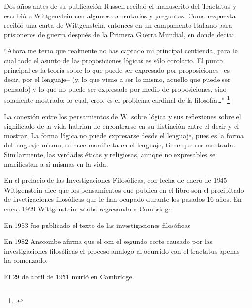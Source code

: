 \documentclass[../main.tex]{subfiles}
\begin{document}
Dos años antes de su publicación Russell recibió el manuscrito del Tractatus y escribió a Wittgenstein con algunos comentarios y preguntas. Como respuesta recibió una carta de Wittgenstein, entonces en un campamento Italiano para prisioneros de guerra después de la Primera Guerra Mundial, en donde decía:

``Ahora me temo que realmente no has captado mi principal contienda, para lo cual todo el asunto de las proposiciones lógicas es sólo corolario. El punto principal es la teoría sobre lo que puede ser expresado por proposiciones --es decir, por el lenguaje-- (y, lo que viene a ser lo mismo, aquello que puede ser pensado) y lo que no puede ser expresado por medio de proposiciones, sino solamente mostrado; lo cual, creo, es el problema cardinal de la filosofía\ldots'' \footcite[p. 161]{IWT}

La conexión entre los pensamientos de W. sobre lógica y sus reflexiones sobre el significado de la vida habrian de encontrarse en su distinción entre el decir y el mostrar. La forma lógica no puede expresarse desde el lenguaje, pues es la forma del lenguaje mismo, se hace manifiesta en el lenguaje, tiene que ser mostrada. Similarmente, las verdades éticas y religiosas, aunque no expresables se manifiestan a sí mismas en la vida. 



En el prefacio de las Investigaciones Filosóficas, con fecha de enero de 1945 Wittgenstein dice que los pensamientos que publica en el libro son el precipitado de invetigaciones filosóficas que le han ocupado durante los pasados 16 años. En enero 1929 Wittgenstein estaba regresando a Cambridge.

En 1953 fue publicado el texto de las investigaciones filosóficas

En 1982 Anscombe afirma que el con el segundo corte causado por las investigaciones filosóficas el proceso analogo al ocurrido con el tractatus apenas ha comenzado.

El 29 de abril de 1951 murió en Cambridge. 
\end{document}

